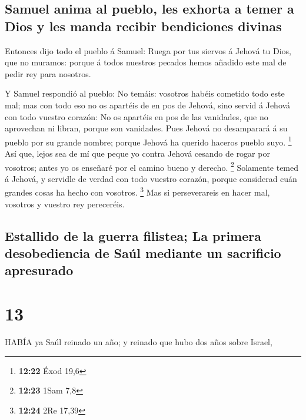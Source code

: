 \hypertarget{samuel-anima-al-pueblo-les-exhorta-a-temer-a-dios-y-les-manda-recibir-bendiciones-divinas}{%
\subsection{Samuel anima al pueblo, les exhorta a temer a Dios y les
manda recibir bendiciones
divinas}\label{samuel-anima-al-pueblo-les-exhorta-a-temer-a-dios-y-les-manda-recibir-bendiciones-divinas}}

 Entonces dijo todo el pueblo á Samuel: Ruega por tus
siervos á Jehová tu Dios, que no muramos: porque á todos nuestros
pecados hemos añadido este mal de pedir rey para nosotros.

 Y Samuel respondió al pueblo: No temáis: vosotros habéis
cometido todo este mal; mas con todo eso no os apartéis de en pos de
Jehová, sino servid á Jehová con todo vuestro corazón:  No
os apartéis en pos de las vanidades, que no aprovechan ni libran, porque
son vanidades.  Pues Jehová no desamparará á su pueblo por
su grande nombre; porque Jehová ha querido haceros pueblo suyo.
\footnote{\textbf{12:22} Éxod 19,6}  Así que, lejos sea de
mí que peque yo contra Jehová cesando de rogar por vosotros; antes yo os
enseñaré por el camino bueno y derecho. \footnote{\textbf{12:23} 1Sam
  7,8}  Solamente temed á Jehová, y servidle de verdad con
todo vuestro corazón, porque considerad cuán grandes cosas ha hecho con
vosotros. \footnote{\textbf{12:24} 2Re 17,39}  Mas si
perseverareis en hacer mal, vosotros y vuestro rey pereceréis.

\hypertarget{estallido-de-la-guerra-filistea-la-primera-desobediencia-de-sauxfal-mediante-un-sacrificio-apresurado}{%
\subsection{Estallido de la guerra filistea; La primera desobediencia de
Saúl mediante un sacrificio
apresurado}\label{estallido-de-la-guerra-filistea-la-primera-desobediencia-de-sauxfal-mediante-un-sacrificio-apresurado}}

\hypertarget{section-12}{%
\section{13}\label{section-12}}

 HABÍA ya Saúl reinado un año; y reinado que hubo dos años
sobre Israel,

